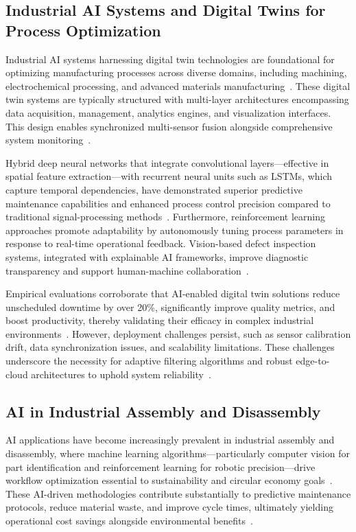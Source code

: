 \documentclass[11pt]{article}
\begin{document}
\subsection{Industrial AI Systems and Digital Twins for Process Optimization}

Industrial AI systems harnessing digital twin technologies are foundational for optimizing manufacturing processes across diverse domains, including machining, electrochemical processing, and advanced materials manufacturing~\cite{6,33}. These digital twin systems are typically structured with multi-layer architectures encompassing data acquisition, management, analytics engines, and visualization interfaces. This design enables synchronized multi-sensor fusion alongside comprehensive system monitoring~\cite{35,45}.  

Hybrid deep neural networks that integrate convolutional layers—effective in spatial feature extraction—with recurrent neural units such as LSTMs, which capture temporal dependencies, have demonstrated superior predictive maintenance capabilities and enhanced process control precision compared to traditional signal-processing methods~\cite{4,15,38}. Furthermore, reinforcement learning approaches promote adaptability by autonomously tuning process parameters in response to real-time operational feedback. Vision-based defect inspection systems, integrated with explainable AI frameworks, improve diagnostic transparency and support human-machine collaboration~\cite{39}.  

Empirical evaluations corroborate that AI-enabled digital twin solutions reduce unscheduled downtime by over 20\%, significantly improve quality metrics, and boost productivity, thereby validating their efficacy in complex industrial environments~\cite{31,36}. However, deployment challenges persist, such as sensor calibration drift, data synchronization issues, and scalability limitations. These challenges underscore the necessity for adaptive filtering algorithms and robust edge-to-cloud architectures to uphold system reliability~\cite{34}.

\subsection{AI in Industrial Assembly and Disassembly}

AI applications have become increasingly prevalent in industrial assembly and disassembly, where machine learning algorithms—particularly computer vision for part identification and reinforcement learning for robotic precision—drive workflow optimization essential to sustainability and circular economy goals~\cite{6,9,44}. These AI-driven methodologies contribute substantially to predictive maintenance protocols, reduce material waste, and improve cycle times, ultimately yielding operational cost savings alongside environmental benefits~\cite{7,13}.  
\end{document}
